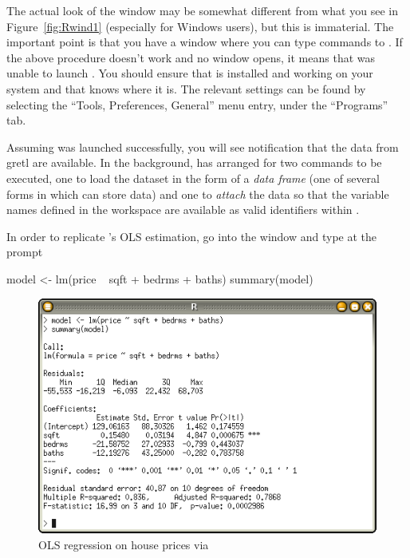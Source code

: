 The actual look of the  window may be somewhat different from
what you see in Figure~\ref{fig:Rwind1} (especially for Windows
users), but this is immaterial. The important point is that you have a
window where you can type commands to . If the above procedure
doesn't work and no  window opens, it means that 
was unable to launch .  You should ensure that  is
installed and working on your system and that  knows where
it is. The relevant settings can be found by selecting the ``Tools,
Preferences, General'' menu entry, under the ``Programs'' tab.

Assuming  was launched successfully, you will see notification
that the data from gretl are available.  In the background,
 has arranged for two  commands to be executed, one
to load the  dataset in the form of a \emph{data frame}
(one of several forms in which  can store data) and one to
\emph{attach} the data so that the variable names defined in the
 workspace are available as valid identifiers within
.

In order to replicate 's OLS estimation, go into the 
window and type at the prompt
\begin{code}
  model <- lm(price ~ sqft + bedrms + baths)
  summary(model)
\end{code}

\begin{figure}[htbp]
  \centering
  \includegraphics[scale=0.7]{figures/Rwindow-2}
  \caption{OLS regression on house prices via }
  \label{fig:Rwind2}
\end{figure}

